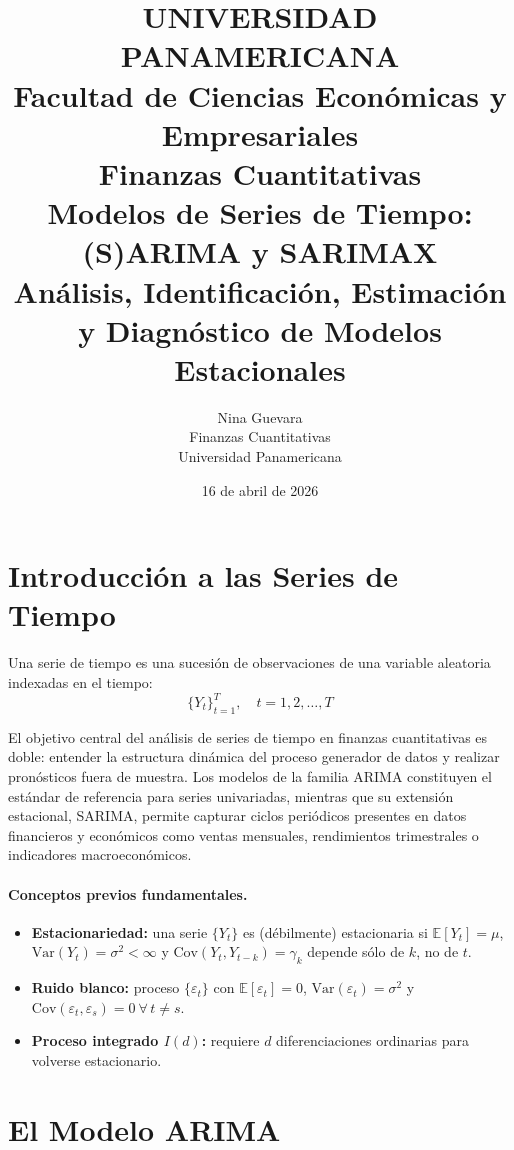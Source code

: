 \documentclass[12pt, a4paper]{article}
\title{%
  \large UNIVERSIDAD PANAMERICANA \\
  \normalsize Facultad de Ciencias Econ\'omicas y Empresariales \\
  \normalsize Finanzas Cuantitativas \\[1.5em]
  \LARGE \textbf{Modelos de Series de Tiempo: (S)ARIMA y SARIMAX} \\[0.5em]
  \large An\'alisis, Identificaci\'on, Estimaci\'on y Diagn\'ostico
         de Modelos Estacionales
}
\author{Nina Guevara \\ \small Finanzas Cuantitativas \\ \small Universidad Panamericana}
\date{16 de abril de 2026}
\begin{document}
\maketitle
\tableofcontents
\newpage

\section{Introducción a las Series de Tiempo}

Una serie de tiempo es una sucesión de observaciones de una variable aleatoria
indexadas en el tiempo:
\[
  \{Y_t\}_{t=1}^{T}, \quad t = 1, 2, \ldots, T
\]

El objetivo central del análisis de series de tiempo en finanzas cuantitativas
es doble: entender la estructura dinámica del proceso generador de datos y
realizar pronósticos fuera de muestra. Los modelos de la familia ARIMA
\cite{BoxJenkins1976} constituyen el estándar de referencia para series
univariadas, mientras que su extensión estacional, SARIMA, permite capturar
ciclos periódicos presentes en datos financieros y económicos como ventas
mensuales, rendimientos trimestrales o indicadores macroeconómicos.

\paragraph{Conceptos previos fundamentales.}
\begin{itemize}
  \item \textbf{Estacionariedad:} una serie $\{Y_t\}$ es (débilmente)
        estacionaria si $\mathbb{E}[Y_t] = \mu$, $\mathrm{Var}(Y_t)=\sigma^2<\infty$
        y $\mathrm{Cov}(Y_t, Y_{t-k}) = \gamma_k$ depende sólo de $k$, no de $t$.
  \item \textbf{Ruido blanco:} proceso $\{\varepsilon_t\}$ con
        $\mathbb{E}[\varepsilon_t]=0$, $\mathrm{Var}(\varepsilon_t)=\sigma^2$ y
        $\mathrm{Cov}(\varepsilon_t,\varepsilon_s)=0\ \forall\, t\neq s$.
  \item \textbf{Proceso integrado $I(d)$:} requiere $d$ diferenciaciones
        ordinarias para volverse estacionario.
\end{itemize}

\section{El Modelo ARIMA}
\end{document}
